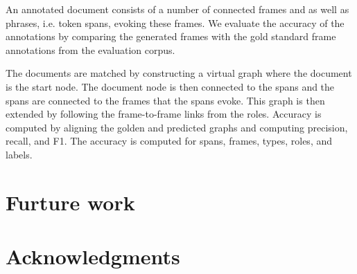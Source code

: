 \documentclass[11pt,a4paper]{article}
\begin{document}
An annotated document consists of a number of connected frames and as well as
phrases, i.e. token spans, evoking these frames. We evaluate the accuracy of the
annotations by comparing the generated frames with the gold standard frame
annotations from the evaluation corpus.

The documents are matched by constructing a virtual graph where the document
is the start node. The document node is then connected to the spans and the
spans are connected to the frames that the spans evoke. This graph is then
extended by following the frame-to-frame links from the roles. Accuracy is
computed by aligning the golden and predicted graphs and computing precision,
recall, and F1. The accuracy is computed for spans, frames, types, roles, and
labels.

\section{Furture work}



\section{Acknowledgments}



\end{document}
